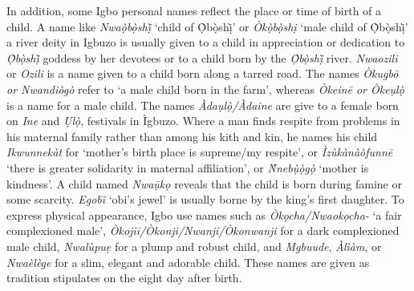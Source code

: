 \documentclass[output=paper]{langscibook}
\begin{document}
In addition, some Igbo personal names reflect the place or time of birth of a child. A name like \textit{Nwaọ̀bọ̀shị̀} ‘child of Ọ̀bọ̀shị̀’ or \textit{Òkọ̀bọ̀shị} ‘male child of Ọ̀bọ̀shị̀’ a river deity in Igbuzo is usually given to a child in appreciation or dedication to \textit{Ọ̀bọ̀shị̀}  goddess by her devotees or to a child born by the \textit{Ọ̀bọ̀shị̀} river. \textit{Nwaozili}  or \textit{Ozili} is a name given to a child born along a tarred road. The names \textit{Òkugbō or Nwandiògò } refer to ‘a male child born in the farm', whereas \textit{Òkeinē or Òkeụlọ̀ } is a name for a male child. The names \textit{Àdaụlọ̀/Àdaine} are give to a female born on \textit{Ine} and \textit{Ụlọ̀}, festivals in Ìgbuzo. Where a man finds respite from problems in his maternal family rather than among his kith and kin, he names his child \textit{Ikwunnekàt} for ‘mother’s birth place is supreme/my respite’, or \textit{Ìzùkànàòfunnē} ‘there is greater solidarity in maternal affiliation’, or \textit{Ǹnebụ̀ọ̀gọ̀} ‘mother is kindness’. A child named \textit{Nwaụ̄kọ} reveals that the child is born during famine or some scarcity. \textit{Egobi}̄  ‘obi’s jewel’ is usually borne by the king’s first daughter. To express physical appearance, Igbo use names such as \textit{Òkọcha/Nwaokọcha-} ‘a fair complexioned male’, \textit{Òkojiī/Òkonji/Nwanji/Òkonwanji} for a dark complexioned male child, \textit{Nwalùpuẹ} for a plump and robust child, and \textit{Mgbuude}, \textit{Àlìàm}, or \textit{Nwaèlège} for a slim, elegant and adorable child. These names are given as tradition stipulates on the eight day after birth.
\end{document}
